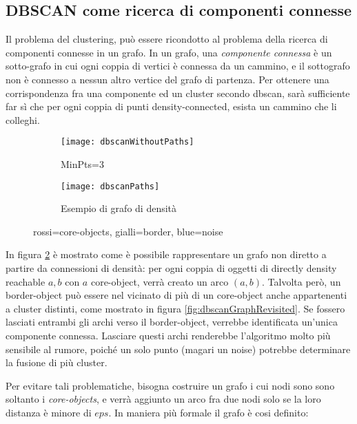 \subsection{DBSCAN come ricerca di componenti connesse }
Il problema del clustering, può essere ricondotto al problema della ricerca di componenti connesse in un grafo.
In un grafo, una \emph{componente connessa} è un sotto-grafo in cui ogni coppia di vertici è connessa da un cammino, e il sottografo non è connesso  a nessun altro vertice  del grafo di partenza. Per ottenere una corrispondenza fra una  componente ed  un cluster secondo dbscan, sarà sufficiente far sì che per ogni coppia di punti  density-connected, esista un cammino che li colleghi.
\begin{figure}
    \centering
    \begin{subfigure}[b]{0.45\textwidth}
        \centering
        \texttt{[image: dbscanWithoutPaths]}
       	\caption{ MinPts=3}
         \label{fig:densityConnectedObjects}
    \end{subfigure}
    \hfill
    \begin{subfigure}[b]{0.45\textwidth}
        \centering
        \texttt{[image: dbscanPaths]}
        \caption{Esempio di grafo di densità}
         \label{fig:graphdensityConnectedObjects}
    \end{subfigure}
    \hfill
    \caption{rossi=core-objects, gialli=border,
    	blue=noise}
    \label{fig:dbscangraph}
\end{figure} 
In figura \ref{fig:graphdensityConnectedObjects} è mostrato come è possibile rappresentare un grafo non diretto a partire da connessioni di densità: per ogni coppia di oggetti di  directly density reachable $a,b$ con $a$ core-object,
verrà creato un arco $(a,b)$.
Talvolta però, un border-object può essere nel vicinato di più di un core-object anche appartenenti a cluster distinti, come mostrato in figura \ref{fig:dbscanGraphRevisited}. Se fossero lasciati entrambi gli archi verso il border-object, verrebbe identificata un'unica componente connessa. Lasciare questi archi renderebbe l'algoritmo molto più sensibile al rumore, poiché  un solo punto (magari un noise) potrebbe determinare la fusione di più cluster.

Per evitare tali problematiche, bisogna costruire un grafo i cui nodi sono sono soltanto i \emph{core-objects}, e verrà aggiunto un arco fra due nodi solo se la loro distanza è minore di $eps$.  In maniera più formale il grafo è cosi definito:

